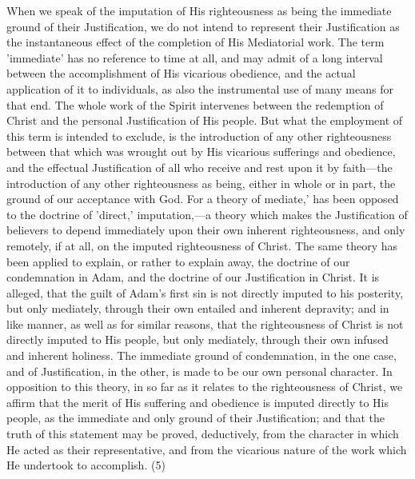 \documentclass[
]{book}
\begin{document}
When we speak of the imputation of His righteousness as being the immediate ground of their Justification, we do not intend to represent their Justification as the instantaneous effect of the completion of His Mediatorial work. The term 'immediate' has no reference to time at all, and may admit of a long interval between the accomplishment of His vicarious obedience, and the actual application of it to individuals, as also the instrumental use of many means for that end. The whole work of the Spirit intervenes between the redemption of Christ and the personal Justification of His people. But what the employment of this term is intended to exclude, is the introduction of any other righteousness between that which was wrought out by His vicarious sufferings and obedience, and the effectual Justification of all who receive and rest upon it by faith---the introduction of any other righteousness as being, either in whole or in part, the ground of our acceptance with God. For a theory of mediate,' has been opposed to the doctrine of 'direct,' imputation,---a theory which makes the Justification of believers to depend immediately upon their own inherent righteousness, and only remotely, if at all, on the imputed righteousness of Christ. The same theory has been applied to explain, or rather to explain away, the doctrine of our condemnation in Adam, and the doctrine of our Justification in Christ. It is alleged, that the guilt of Adam's first sin is not directly imputed to his posterity, but only mediately, through their own entailed and inherent depravity; and in like manner, as well as for similar reasons, that the righteousness of Christ is not directly imputed to His people, but only mediately, through their own infused and inherent holiness. The immediate ground of condemnation, in the one case, and of Justification, in the other, is made to be our own personal character. In opposition to this theory, in so far as it relates to the righteousness of Christ, we affirm that the merit of His suffering and obedience is imputed directly to His people, as the immediate and only ground of their Justification; and that the truth of this statement may be proved, deductively, from the character in which He acted as their representative, and from the vicarious nature of the work which He undertook to accomplish. (5)
\end{document}
